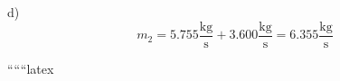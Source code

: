 d)
\[
m_2 = 5.755 \frac{\text{kg}}{\text{s}} + 3.600 \frac{\text{kg}}{\text{s}} = 6.355 \frac{\text{kg}}{\text{s}}
\]

``````latex